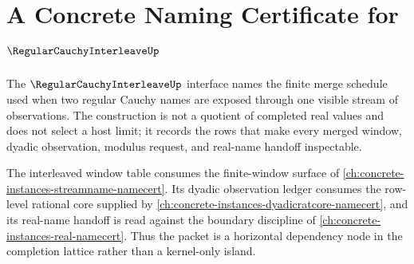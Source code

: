 \chapter{A Concrete Naming Certificate for $\RegularCauchyInterleaveUp$}
\label{ch:concrete-instances-regularcauchyinterleave-namecert}

The $\RegularCauchyInterleaveUp$ interface names the finite merge schedule used when two regular Cauchy names are exposed through one visible stream of observations. The construction is not a quotient of completed real values and does not select a host limit; it records the rows that make every merged window, dyadic observation, modulus request, and real-name handoff inspectable.

The interleaved window table consumes the finite-window surface of \autoref{ch:concrete-instances-streamname-namecert}. Its dyadic observation ledger consumes the row-level rational core supplied by \autoref{ch:concrete-instances-dyadicratcore-namecert}, and its real-name handoff is read against the boundary discipline of \autoref{ch:concrete-instances-real-namecert}. Thus the packet is a horizontal dependency node in the completion lattice rather than a kernel-only island.


